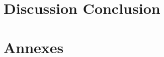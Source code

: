 \documentclass[a4paper,12pt,notitlepage]{report}
\numberwithin{equation}{section}
\begin{document}
\chapter*{Discussion Conclusion}

\chapter*{Annexes}


\listoffigures

\listoftables




\end{document}

